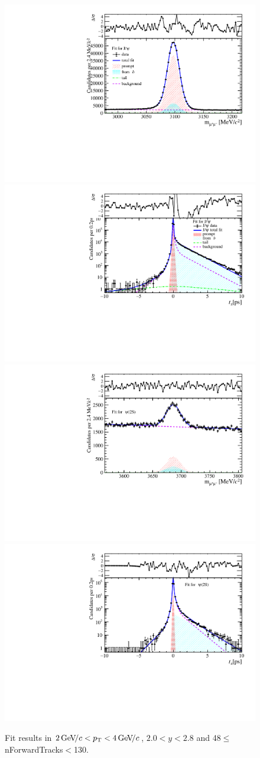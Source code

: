\begin{figure}[H]
\begin{center}
\includegraphics[width=0.47\linewidth]{pdf/Jpsi/drawmassF/n5y1pt2.pdf}
\includegraphics[width=0.47\linewidth]{pdf/Jpsi/2DFitF/n5y1pt2.pdf}
\vspace*{-0.5cm}
\includegraphics[width=0.47\linewidth]{pdf/Psi2S/drawmassF/n5y1pt2.pdf}
\includegraphics[width=0.47\linewidth]{pdf/Psi2S/2DFitF/n5y1pt2.pdf}
\vspace*{-0.5cm}
\end{center}
\caption{Fit results in $2\text{\,Ge\kern -0.1em V\!/}c<p_{\mathrm{T}}<4\text{\,Ge\kern -0.1em V\!/}c$, $2.0<y<2.8$ and 48$\leq$nForwardTracks$<$130.}
\label{Fitn5y1pt2}
\end{figure}
